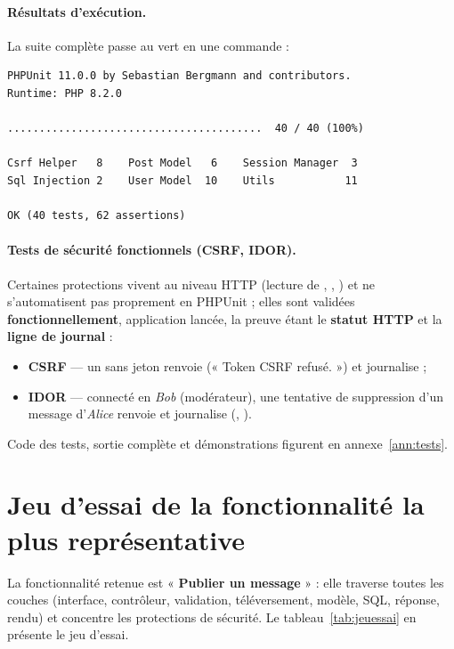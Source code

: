 \paragraph{Résultats d'exécution.} La suite complète passe au vert en une commande :

\begin{lstlisting}[style=text, caption={Résumé d'exécution de la suite PHPUnit (\code{--testdox})}]
PHPUnit 11.0.0 by Sebastian Bergmann and contributors.
Runtime: PHP 8.2.0

........................................  40 / 40 (100%)

Csrf Helper   8    Post Model   6    Session Manager  3
Sql Injection 2    User Model  10    Utils           11

OK (40 tests, 62 assertions)
\end{lstlisting}

\paragraph{Tests de sécurité fonctionnels (CSRF, IDOR).} Certaines protections vivent au niveau
HTTP (lecture de , , ) et ne s'automatisent pas
proprement en PHPUnit ; elles sont validées \textbf{fonctionnellement}, application lancée, la
preuve étant le \textbf{statut HTTP} et la \textbf{ligne de journal} :
\begin{itemize}
  \item \textbf{CSRF} — un  sans jeton renvoie  (« Token CSRF
        refusé. ») et journalise  ;
  \item \textbf{IDOR} — connecté en \emph{Bob} (modérateur), une tentative de suppression d'un
        message d'\emph{Alice} renvoie  et journalise 
        (, ).
\end{itemize}
Code des tests, sortie complète et démonstrations figurent en annexe~\ref{ann:tests}.

\section{Jeu d'essai de la fonctionnalité la plus représentative}
\label{sec:jeuessai}

La fonctionnalité retenue est « \textbf{Publier un message} » : elle traverse toutes les couches
(interface, contrôleur, validation, téléversement, modèle, SQL, réponse, rendu) et concentre les
protections de sécurité. Le tableau~\ref{tab:jeuessai} en présente le jeu d'essai.

